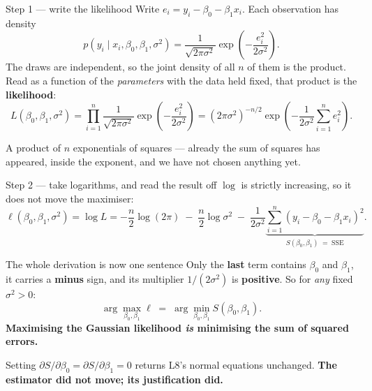 \documentclass[aspectratio=169]{beamer}
\begin{document}
\begin{frame}[shrink=4]{Step 1 --- write the likelihood}
  Write $e_i = y_i - \beta_0 - \beta_1 x_i$. Each observation has density
  \[
    p(y_i \mid x_i, \beta_0, \beta_1, \sigma^2)
      = \frac{1}{\sqrt{2\pi\sigma^2}}
        \exp\!\left(-\frac{e_i^2}{2\sigma^2}\right).
  \]
  The draws are independent, so the joint density of all $n$ of them is the
  product. Read as a function of the \emph{parameters} with the data held
  fixed, that product is the \textbf{likelihood}:
  \[
    L(\beta_0, \beta_1, \sigma^2)
      = \prod_{i=1}^{n} \frac{1}{\sqrt{2\pi\sigma^2}}
        \exp\!\left(-\frac{e_i^2}{2\sigma^2}\right)
      = (2\pi\sigma^2)^{-n/2}
        \exp\!\left(-\frac{1}{2\sigma^2}\sum_{i=1}^{n} e_i^2\right).
  \]
  \begin{block}{}
    \small A product of $n$ exponentials of squares --- already the sum of
    squares has appeared, inside the exponent, and we have not chosen
    anything yet.
  \end{block}
\end{frame}

\begin{frame}[shrink=4]{Step 2 --- take logarithms, and read the result off}
  $\log$ is strictly increasing, so it does not move the maximiser:
  \[
    \ell(\beta_0,\beta_1,\sigma^2) = \log L
      = -\frac{n}{2}\log(2\pi)
        \;-\; \frac{n}{2}\log \sigma^2
        \;-\; \frac{1}{2\sigma^2}\underbrace{\sum_{i=1}^{n}
              (y_i - \beta_0 - \beta_1 x_i)^2}_{\textstyle S(\beta_0,\beta_1)
              \;=\; \mathrm{SSE}} .
  \]
  \begin{alertblock}{The whole derivation is now one sentence}
    Only the \textbf{last} term contains $\beta_0$ and $\beta_1$, it carries a
    \textbf{minus} sign, and its multiplier $1/(2\sigma^2)$ is
    \textbf{positive}. So for \emph{any} fixed $\sigma^2 > 0$:
    \[
      \arg\max_{\beta_0,\beta_1} \ell
      \;=\; \arg\min_{\beta_0,\beta_1} S(\beta_0,\beta_1) .
    \]
    \centering\textbf{Maximising the Gaussian likelihood \emph{is} minimising
    the sum of squared errors.}
  \end{alertblock}
  \vspace{0.1em}
  \begin{center}\small
    Setting $\partial S/\partial\beta_0 = \partial S/\partial\beta_1 = 0$
    returns L8's normal equations unchanged. \textbf{The estimator did not
    move; its justification did.}
  \end{center}
\end{frame}
\end{document}
